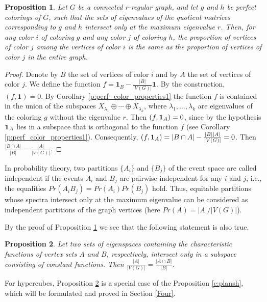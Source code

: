 \documentclass[11pt]{article}
\newtheorem{claim}{Proposition}[section]
\theoremstyle{definition}
\begin{document}
\begin{claim}\label{c:color_distr_proportion}
Let $G$ be a connected $r$-regular graph, and let $g$ and $h$ be perfect
colorings of $G$, such that the sets of eigenvalues of the quotient matrices
corresponding to $g$ and $h$ intersect only at the maximum
eigenvalue $r$. Then, for any color $i$ of coloring $g$ and
any color $j$ of coloring $h$, the proportion of vertices of color $j$ among the vertices
of color $i$ is the same as the proportion of vertices of color $j$ in the entire graph.
\end{claim}
\begin{proof}
Denote by $B$ the set of vertices of color $i$ and by $A$ the set
of vertices of color $j$. We define the function
$f=\mathbf{1}_{B} - \frac{|B|}{|V(G)|}\mathbf{1}$. By the construction,
$(f,\mathbf{1})=0$. By Corollary \ref{p:perf_color_properties1}
the function $f$ is contained in the union of the subspaces $X_{\lambda_1}\oplus\cdots \oplus X_{\lambda_k}$, where $\lambda_1,\dots,\lambda_k$  are eigenvalues
of the coloring $g$ without the eigenvalue $r$. Then
$(f,{\bf 1}_{A})=0$, since by the hypothesis ${\bf 1}_{A}$ lies in
a subspace that is orthogonal to the function $f$ (see Corollary
\ref{p:perf_color_properties1}). Consequently,
$(f,{\bf 1}_{A})=|B\cap A|-\frac{|B||A|}{|V(G)|}=0$. Then
$\frac{|B\cap A|}{|B|}=\frac{|A|}{|V(G)|}$.
\end{proof}

In probability theory, two partitions $\{A_i\}$ and $\{B_j\}$
of the event space are called independent if the events $A_i$ and $B_j$ are pairwise independent for any $i$ and $j$, i.e., the equalities
$Pr(A_iB_j)=Pr(A_i)Pr(B_j)$ hold. Thus,
equitable partitions whose spectra intersect only at
the maximum eigenvalue can be considered as
independent partitions of the graph vertices (here $Pr(A)=|A|/|V(G)|$).

By the proof  of Proposition \ref{c:color_distr_proportion} we see that the following statement is also true. 

\begin{claim}\label{c:color_distr_proportion0}
Let two sets of eigenspaces  containing the characteristic functions of  vertex sets
$A$ and $B$, respectively, intersect only in a subspace
consisting of constant functions. Then
$\frac{|A|}{|V(G)|}=\frac{|A\cap B|}{|B|}$.
\end{claim}

For hypercubes, Proposition \ref{c:color_distr_proportion0} is
a special case of the Proposition  \ref{c:plansh}, which will be
formulated and proved in Section \ref{Four}.
\end{document}
